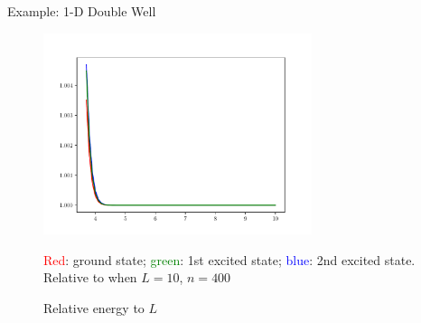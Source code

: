 \documentclass[12pt]{beamer}
\begin{document}
    \begin{frame}{Example: 1-D Double Well}
        \begin{figure}
            \includegraphics[width=0.7\textwidth]{percent-length-SineDVR.pdf}
            \caption{Relative energy to $L$}
            \footnotesize
            \textcolor{red}{Red}: ground state; \textcolor{green}{green}: 1st excited state; \textcolor{blue}{blue}: 2nd excited state. Relative to when $L = 10$, $n = 400$
        \end{figure}
    \end{frame}
\end{document}
